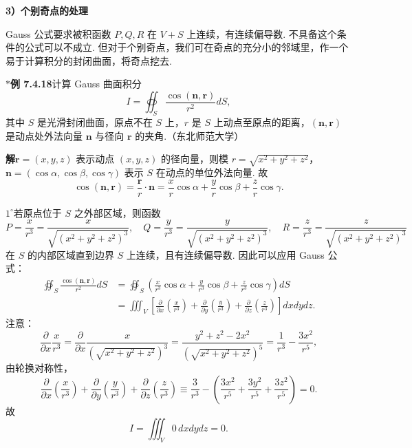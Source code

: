 \documentclass[UTF8, 12pt, fontset=fandol, oneside]{ctexart}
\begin{document}
\noindent\textbf{3）个别奇点的处理}

Gauss 公式要求被积函数 $P,Q,R$ 在 $V+S$ 上连续，有连续偏导数. 不具备这个条件的公式可以不成立. 但对于个别奇点，我们可在奇点的充分小的邻域里，作一个易于计算积分的封闭曲面，将奇点挖去.

\noindent\textbf{$*$例 7.4.18}\quad 计算 Gauss 曲面积分
\[
I=\oiint_S\frac{\cos(\mathbf n,\mathbf r)}{r^2}dS,
\]
其中 $S$ 是光滑封闭曲面，原点不在 $S$ 上，$r$ 是 $S$ 上动点至原点的距离，$(\mathbf n,\mathbf r)$ 是动点处外法向量 $\mathbf n$ 与径向 $\mathbf r$ 的夹角.（东北师范大学）

\noindent\textbf{解}\quad $\mathbf r=(x,y,z)$ 表示动点 $(x,y,z)$ 的径向量，则模 $r=\sqrt{x^2+y^2+z^2}$，$\mathbf n=(\cos\alpha,\cos\beta,\cos\gamma)$ 表示 $S$ 在动点的单位外法向量. 故
\[
\cos(\mathbf n,\mathbf r)=\frac{\mathbf r}{r}\cdot\mathbf n
=\frac xr\cos\alpha+\frac yr\cos\beta+\frac zr\cos\gamma.
\]

\noindent\textbf{$1^\circ$}\quad 若原点位于 $S$ 之外部区域，则函数
\[
P=\frac{x}{r^3}=\frac{x}{\sqrt{(x^2+y^2+z^2)^3}},\quad
Q=\frac{y}{r^3}=\frac{y}{\sqrt{(x^2+y^2+z^2)^3}},\quad
R=\frac{z}{r^3}=\frac{z}{\sqrt{(x^2+y^2+z^2)^3}} \tag{1}
\]
在 $S$ 的内部区域直到边界 $S$ 上连续，且有连续偏导数. 因此可以应用 Gauss 公式：
\begin{equation}
\begin{aligned}
\oiint_S\frac{\cos(\mathbf n,\mathbf r)}{r^2}dS
&=\oiint_S\left(\frac x{r^3}\cos\alpha+\frac y{r^3}\cos\beta+\frac z{r^3}\cos\gamma\right)dS\\
&=\iiint_V\left[
\frac{\partial}{\partial x}\left(\frac x{r^3}\right)
+\frac{\partial}{\partial y}\left(\frac y{r^3}\right)
+\frac{\partial}{\partial z}\left(\frac z{r^3}\right)
\right]dxdydz.
\end{aligned}
\tag{2}
\end{equation}
注意：
\[
\frac{\partial}{\partial x}\frac x{r^3}
=\frac{\partial}{\partial x}\frac{x}{\left(\sqrt{x^2+y^2+z^2}\right)^3}
=\frac{y^2+z^2-2x^2}{\left(\sqrt{x^2+y^2+z^2}\right)^5}
=\frac1{r^3}-\frac{3x^2}{r^5},
\]
由轮换对称性，
\[
\frac{\partial}{\partial x}\left(\frac x{r^3}\right)
+\frac{\partial}{\partial y}\left(\frac y{r^3}\right)
+\frac{\partial}{\partial z}\left(\frac z{r^3}\right)
\equiv\frac3{r^3}-\left(\frac{3x^2}{r^5}+\frac{3y^2}{r^5}+\frac{3z^2}{r^5}\right)=0.
\]
故
\[
I=\iiint_V0\,dxdydz=0.
\]
\end{document}
